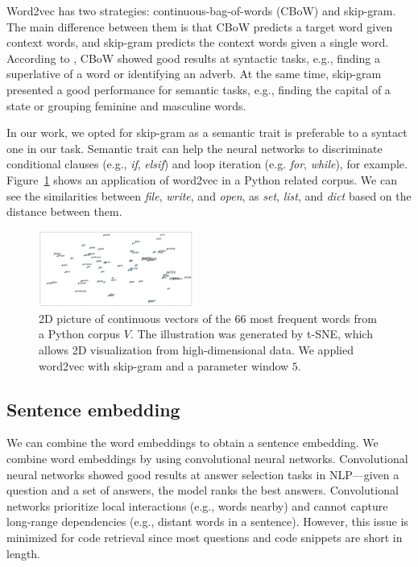 \documentclass[sigconf]{acmart}
\begin{document}
Word2vec has two strategies: continuous-bag-of-words (CBoW) and skip-gram. The main difference between them is that CBoW predicts a target word given context words, and skip-gram predicts the context words given a single word. According to \citet{mikolov2013distributed}, CBoW showed good results at syntactic tasks, e.g., finding a superlative of a word or identifying an adverb. At the same time, skip-gram presented a good performance for semantic tasks, e.g., finding the capital of a state or grouping feminine and masculine words. 

In our work, we opted for skip-gram as a semantic trait is preferable to a syntact one in our task. Semantic trait can help the neural networks to discriminate conditional clauses (e.g., \emph{if}, \emph{elsif}) and loop iteration (e.g. \emph{for}, \emph{while}), for example. Figure~\ref{fig:tsne-code-snippet-python} shows an application of word2vec in a Python related corpus. We can see the similarities between \emph{file}, \emph{write}, and \emph{open}, as \emph{set}, \emph{list}, and \emph{dict} based on the distance between them.

\begin{figure}[h]
\includegraphics[width=0.45\textwidth]{figuras/code_tsne.png}
\caption{2D picture of continuous vectors of the 66 most frequent words from a Python corpus $V$. The illustration was generated by t-SNE, which allows 2D visualization from high-dimensional data. We applied word2vec with skip-gram and a parameter window $5$.}

\label{fig:tsne-code-snippet-python}
\end{figure}

\subsection{Sentence embedding}

We can combine the word embeddings to obtain a sentence embedding. We combine word embeddings by using convolutional neural networks. Convolutional neural networks showed good results at answer selection tasks in NLP---given a question and a set of answers, the model ranks the best answers. Convolutional networks prioritize local interactions (e.g., words nearby) and cannot capture long-range dependencies (e.g., distant words in a sentence). However, this issue is minimized for code retrieval since most questions and code snippets are short in length.
\end{document}
